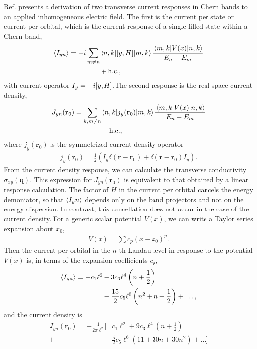 \documentclass[aps,prb,twocolumn,letterpaper,twoside,nobalancelastpage,groupedaddress,amsmath,amssymb,floatfix,citeautoscript]{revtex4-1}
\begin{document}
Ref.  presents a derivation of two transverse current responses in Chern bands to an applied inhomogeneous electric field. The first is the current per state or current per orbital, which is the current response of a single filled state within a Chern band,
\begin{align}
\label{current-per-orbital}
\expval{I_{yn}} = -i\sum_{m\neq n} &\mel{n,k}{\comm{y}{H}}{m,k}\frac{\mel{m,k}{V(x)}{n,k}}{E_n-E_m}\nonumber\\ &+ \text{h.c.,}
\end{align}
with current operator $I_{y} = -i\comm{y}{H}$.The second response is the real-space current density, 
\begin{align}
\label{current-density}
J_{yn}(\mathbf{r}_0) = \sum_{k,m\neq n} &\mel{n,k}{j_y(\mathbf{r}_0)}{m,k} \frac{\mel{m,k}{V(x)}{n,k}}{E_n-E_m}\nonumber \\ &+ \text{h.c.,}
\end{align}
where $j_y(\mathbf{r}_0)$ is the symmetrized current density operator
\begin{align*}
j_y(\mathbf{r}_0) = \frac{1}{2}\left(I_y \delta(\mathbf{r} - \mathbf{r}_0) + \delta(\mathbf{r} - \mathbf{r}_0)I_y \right).
\end{align*}
From the current density response, we can calculate the transverse conductivity $\sigma_{xy}(\mathbf{q})$. This expression for $J_{yn}(\mathbf{r}_0)$ is equivalent to that obtained by a linear response calculation. The factor of $H$ in the current per orbital cancels the energy demoniator, so that $\expval{I_yn}$ depends only on the band projectors and not on the energy dispersion. In contrast, this cancellation does not occur in the case of the current density. For a generic scalar potential $V(x)$, we can write a Taylor series expansion about $x_0$,
\begin{align*}
V(x) = \sum c_p (x - x_0)^p.
\end{align*}
Then the current per orbital in the $n$-th Landau level in response to the potential $V(x)$ is, in terms of the expansion coefficients $c_p$,
\begin{align}
\label{current-per-orbital-expansion}
\expval{I_{yn}} = -c_1\ell^2 &- 3c_3 \ell^4\left(n+\frac{1}{2}\right)\nonumber\\ &- \frac{15}{2}c_5\ell^6 \left(n^2 + n + \frac{1}{2}\right) + \ldots,
\end{align}
and the current density is
\begin{align}
\label{current-density-expansion}
J_{yn}(\mathbf{r}_0)=-\frac{1}{2\pi\ell^2}[&c_1\ell^2 + 9c_3 \ell^4\left(n+\frac{1}{2}\right) \nonumber\\ + &\frac{5}{2}c_5 \ell^6\left(11 + 30n + 30n^2\right) + \ldots]
\end{align}
\end{document}
